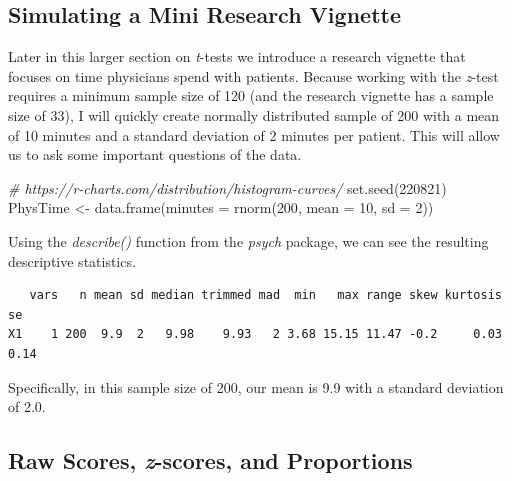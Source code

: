 \documentclass[
  11pt,
]{book}
\newenvironment{Shaded}{\begin{snugshade}}{\end{snugshade}}
\newcommand{\AttributeTok}[1]{\textcolor[rgb]{0.77,0.63,0.00}{#1}}
\newcommand{\CommentTok}[1]{\textcolor[rgb]{0.56,0.35,0.01}{\textit{#1}}}
\newcommand{\DecValTok}[1]{\textcolor[rgb]{0.00,0.00,0.81}{#1}}
\newcommand{\FunctionTok}[1]{\textcolor[rgb]{0.00,0.00,0.00}{#1}}
\newcommand{\NormalTok}[1]{#1}
\newcommand{\OtherTok}[1]{\textcolor[rgb]{0.56,0.35,0.01}{#1}}
\newcommand{\SpecialCharTok}[1]{\textcolor[rgb]{0.00,0.00,0.00}{#1}}
\begin{document}
\hypertarget{simulating-a-mini-research-vignette}{%
\subsection{Simulating a Mini Research Vignette}\label{simulating-a-mini-research-vignette}}

Later in this larger section on \emph{t}-tests we introduce a research vignette that focuses on time physicians spend with patients. Because working with the \emph{z}-test requires a minimum sample size of 120 (and the research vignette has a sample size of 33), I will quickly create normally distributed sample of 200 with a mean of 10 minutes and a standard deviation of 2 minutes per patient. This will allow us to ask some important questions of the data.

\begin{Shaded}
\begin{Highlighting}[]
\CommentTok{\# https://r{-}charts.com/distribution/histogram{-}curves/}
\FunctionTok{set.seed}\NormalTok{(}\DecValTok{220821}\NormalTok{)}
\NormalTok{PhysTime }\OtherTok{\textless{}{-}} \FunctionTok{data.frame}\NormalTok{(}\AttributeTok{minutes =} \FunctionTok{rnorm}\NormalTok{(}\DecValTok{200}\NormalTok{, }\AttributeTok{mean =} \DecValTok{10}\NormalTok{, }\AttributeTok{sd =} \DecValTok{2}\NormalTok{))}
\end{Highlighting}
\end{Shaded}

Using the \emph{describe()} function from the \emph{psych} package, we can see the resulting descriptive statistics.

\begin{Shaded}
\end{Shaded}

\begin{verbatim}
   vars   n mean sd median trimmed mad  min   max range skew kurtosis   se
X1    1 200  9.9  2   9.98    9.93   2 3.68 15.15 11.47 -0.2     0.03 0.14
\end{verbatim}

Specifically, in this sample size of 200, our mean is 9.9 with a standard deviation of 2.0.

\hypertarget{raw-scores-z-scores-and-proportions}{%
\subsection{\texorpdfstring{Raw Scores, \emph{z}-scores, and Proportions}{Raw Scores, z-scores, and Proportions}}\label{raw-scores-z-scores-and-proportions}}
\end{document}
